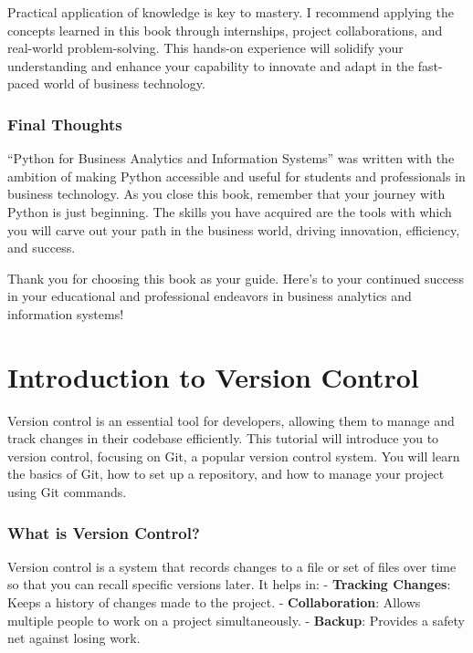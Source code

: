 \documentclass[
  letterpaper,
  DIV=11,
  numbers=noendperiod]{scrreprt}
\begin{document}
Practical application of knowledge is key to mastery. I recommend
applying the concepts learned in this book through internships, project
collaborations, and real-world problem-solving. This hands-on experience
will solidify your understanding and enhance your capability to innovate
and adapt in the fast-paced world of business technology.

\subsection{Final Thoughts}\label{final-thoughts}

``Python for Business Analytics and Information Systems'' was written
with the ambition of making Python accessible and useful for students
and professionals in business technology. As you close this book,
remember that your journey with Python is just beginning. The skills you
have acquired are the tools with which you will carve out your path in
the business world, driving innovation, efficiency, and success.

Thank you for choosing this book as your guide. Here's to your continued
success in your educational and professional endeavors in business
analytics and information systems!


\chapter{Introduction to Version
Control}\label{introduction-to-version-control}

Version control is an essential tool for developers, allowing them to
manage and track changes in their codebase efficiently. This tutorial
will introduce you to version control, focusing on Git, a popular
version control system. You will learn the basics of Git, how to set up
a repository, and how to manage your project using Git commands.

\subsection{What is Version Control?}\label{what-is-version-control}

Version control is a system that records changes to a file or set of
files over time so that you can recall specific versions later. It helps
in: - \textbf{Tracking Changes}: Keeps a history of changes made to the
project. - \textbf{Collaboration}: Allows multiple people to work on a
project simultaneously. - \textbf{Backup}: Provides a safety net against
losing work.
\end{document}

